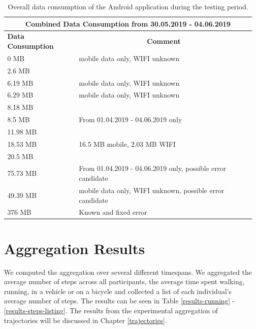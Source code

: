 \begin{table}[h!]
	\centering
	\begin{tabular}{|l|l|}
		\hline
		\multicolumn{2}{|c|}{\textbf{Combined Data Consumption from 30.05.2019 - 04.06.2019}}                     \\ \hline
		\textbf{Data Consumption} & \multicolumn{1}{c|}{\textbf{Comment}}                       \\ \hline
		0 MB                               & mobile data only, WIFI unknown                              \\ \hline
		2.6 MB                             &                                                             \\ \hline
		6.19 MB                            & mobile data only, WIFI unknown                              \\ \hline
		6.29 MB                            & mobile data only, WIFI unknown                              \\ \hline
		8.18 MB                            &                                                             \\ \hline
		8.5 MB                             & From 01.04.2019 - 04.06.2019 only                           \\ \hline
		11.98 MB                           &                                                             \\ \hline
		18.53 MB                           & 16.5 MB mobile, 2.03 MB WIFI                                \\ \hline
		20.5 MB                            &                                                             \\ \hline
		75.73 MB                           & From 01.04.2019 - 04.06.2019 only, possible error candidate \\ \hline
		49.39 MB                           & mobile data only, WIFI unknown, possible error candidate    \\ \hline
		376 MB                             & Known and fixed error                                       \\ \hline
	\end{tabular}
	\caption{Overall data consumption of the Android application during the testing period.}
	\label{data-consumption}
\end{table}

\section{Aggregation Results}\label{results}
We computed the aggregation over several different timespans. We aggregated the average number of steps across all participants, the average time spent walking, running, in a vehicle or on a bicycle and collected a list of each individual's average number of steps. The results can be seen in Table \ref{results-running} - \ref{results-steps-listing}. The results from the experimental aggregation of trajectories will be discussed in Chapter \ref{trajectories}.

